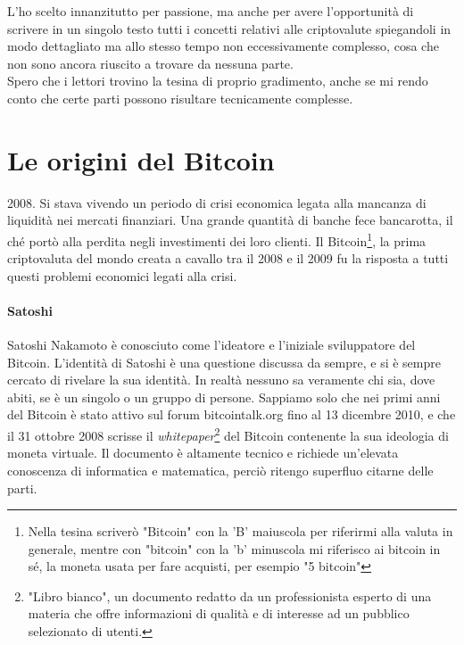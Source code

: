 \documentclass {article}
\begin{document}
\medskip
\noindent
%
L'ho scelto innanzitutto per passione, ma anche per avere l'opportunità di scrivere in un singolo testo tutti i concetti relativi alle criptovalute spiegandoli in modo dettagliato ma allo stesso tempo non eccessivamente complesso, cosa che non sono ancora riuscito a trovare da nessuna parte.\\

\medskip
\noindent
%
Spero che i lettori trovino la tesina di proprio gradimento, anche se mi rendo conto che certe parti possono risultare tecnicamente complesse.


\newpage
\null
\newpage


\tableofcontents


\newpage
\null
\newpage


\section {Le origini del Bitcoin}


2008. Si stava vivendo un periodo di crisi economica legata alla mancanza di liquidità nei mercati finanziari.
Una grande quantità di banche fece bancarotta, il ché portò alla perdita negli investimenti dei loro clienti.
Il Bitcoin\footnote{Nella tesina scriverò "Bitcoin" con la 'B' maiuscola per riferirmi alla valuta in generale, mentre con "bitcoin" con la 'b' minuscola mi riferisco ai bitcoin in sé, la moneta usata per fare acquisti, per esempio "5 bitcoin"}, la prima criptovaluta del mondo creata a cavallo tra il 2008 e il 2009 fu la risposta a tutti questi problemi economici legati alla crisi.

\paragraph {Satoshi}

Satoshi Nakamoto è conosciuto come l'ideatore e l'iniziale sviluppatore del Bitcoin.
L'identità di Satoshi è una questione discussa da sempre, e si è sempre cercato di rivelare la sua identità.
In realtà nessuno sa veramente chi sia, dove abiti, se è un singolo o un gruppo di persone. Sappiamo solo che nei primi anni del Bitcoin è stato attivo sul forum bitcointalk.org fino al 13 dicembre 2010, e che il 31 ottobre 2008 scrisse il \textit{whitepaper}\footnote{"Libro bianco", un documento redatto da un professionista esperto di una materia che offre informazioni di qualità e di interesse ad un pubblico selezionato di utenti.} del Bitcoin contenente la sua ideologia di moneta virtuale.
Il documento è altamente tecnico e richiede un'elevata conoscenza di informatica e matematica, perciò ritengo superfluo citarne delle parti. \cite{whitepaper}
\end{document}
